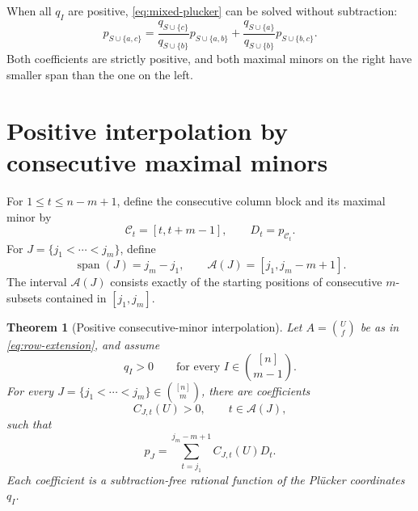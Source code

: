 \documentclass{amsart}
\numberwithin{equation}{section}
\newtheorem{theorem}{Theorem}
\theoremstyle{definition}
\theoremstyle{remark}
\newcommand{\cC}{\mathcal C}
\begin{document}
When all $q_I$ are positive, \eqref{eq:mixed-plucker} can be solved without subtraction:
\begin{equation}\label{eq:positive-step}
 p_{S\cup\{a,c\}}
 =\frac{q_{S\cup\{c\}}}{q_{S\cup\{b\}}}
   p_{S\cup\{a,b\}}
 +\frac{q_{S\cup\{a\}}}{q_{S\cup\{b\}}}
   p_{S\cup\{b,c\}}.
\end{equation}
Both coefficients are strictly positive, and both maximal minors on the right have smaller span than the one on the left.

\section{Positive interpolation by consecutive maximal minors}\label{sec:interpolation}

For $1\le t\le n-m+1$, define the consecutive column block and its maximal minor by
\begin{equation}\label{eq:anchors}
 \cC_t=[t,t+m-1],
 \qquad
 D_t=p_{\cC_t}.
\end{equation}
For $J=\{j_1<\cdots<j_m\}$, define
\[
 \operatorname{span}(J)=j_m-j_1,
 \qquad
 \mathcal A(J)=[j_1,j_m-m+1].
\]
The interval $\mathcal A(J)$ consists exactly of the starting positions of consecutive $m$-subsets contained in $[j_1,j_m]$.

\begin{theorem}[Positive consecutive-minor interpolation]\label{thm:interpolation}
Let $A=\binom{U}{f}$ be as in \eqref{eq:row-extension}, and assume
\begin{equation}\label{eq:qpositive}
 q_I>0\qquad\text{for every }I\in\binom{[n]}{m-1}.
\end{equation}
For every $J=\{j_1<\cdots<j_m\}\in\binom{[n]}m$, there are coefficients
\[
 C_{J,t}(U)>0,
 \qquad t\in\mathcal A(J),
\]
such that
\begin{equation}\label{eq:interpolation}
 p_J=\sum_{t=j_1}^{j_m-m+1}C_{J,t}(U)D_t.
\end{equation}
Each coefficient is a subtraction-free rational function of the Pl\"ucker coordinates $q_I$.
\end{theorem}
\end{document}
